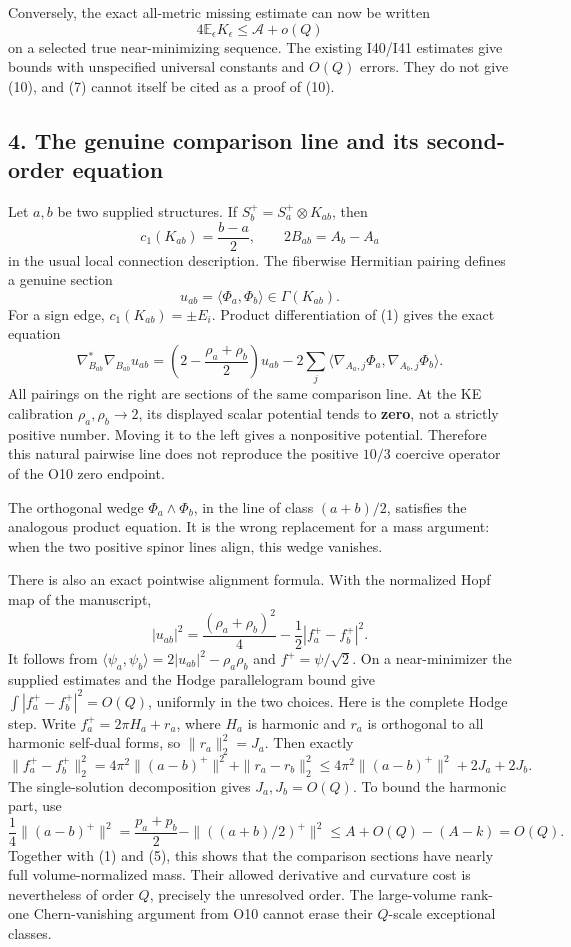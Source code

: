 \documentclass[
]{article}
\begin{document}
Conversely, the exact all-metric missing estimate can now be written \[
4\mathbb E_\epsilon K_\epsilon\le\mathcal A+o(Q)
\tag{10}
\] on a selected true near-minimizing sequence. The existing I40/I41
estimates give bounds with unspecified universal constants and \(O(Q)\)
errors. They do not give (10), and (7) cannot itself be cited as a proof
of (10).

\hypertarget{the-genuine-comparison-line-and-its-second-order-equation}{%
\subsection{4. The genuine comparison line and its second-order
equation}\label{the-genuine-comparison-line-and-its-second-order-equation}}

Let \(a,b\) be two supplied structures. If
\(S_b^+=S_a^+\otimes K_{ab}\), then \[
c_1(K_{ab})=\frac{b-a}{2},\qquad
2B_{ab}=A_b-A_a
\] in the usual local connection description. The fiberwise Hermitian
pairing defines a genuine section \[
u_{ab}=\langle\Phi_a,\Phi_b\rangle\in\Gamma(K_{ab}).
\] For a sign edge, \(c_1(K_{ab})=\pm E_i\). Product differentiation of
(1) gives the exact equation \[
\boxed{
\nabla_{B_{ab}}^*\nabla_{B_{ab}}u_{ab}
=\left(2-\frac{\rho_a+\rho_b}{2}\right)u_{ab}
 -2\sum_j\langle\nabla_{A_a,j}\Phi_a,
                         \nabla_{A_b,j}\Phi_b\rangle.}
\tag{11}
\] All pairings on the right are sections of the same comparison line.
At the KE calibration \(\rho_a,\rho_b\to2\), its displayed scalar
potential tends to \textbf{zero}, not a strictly positive number. Moving
it to the left gives a nonpositive potential. Therefore this natural
pairwise line does not reproduce the positive \(10/3\) coercive operator
of the O10 zero endpoint.

The orthogonal wedge \(\Phi_a\wedge\Phi_b\), in the line of class
\((a+b)/2\), satisfies the analogous product equation. It is the wrong
replacement for a mass argument: when the two positive spinor lines
align, this wedge vanishes.

There is also an exact pointwise alignment formula. With the normalized
Hopf map of the manuscript, \[
\boxed{|u_{ab}|^2=\frac{(\rho_a+\rho_b)^2}{4}
-\frac12|f_a^+-f_b^+|^2.}
\tag{12}
\] It follows from
\(\langle\psi_a,\psi_b\rangle=2|u_{ab}|^2-\rho_a\rho_b\) and
\(f^+=\psi/\sqrt2\). On a near-minimizer the supplied estimates and the
Hodge parallelogram bound give \(\int|f_a^+-f_b^+|^2=O(Q)\), uniformly
in the two choices. Here is the complete Hodge step. Write
\(f_a^+=2\pi H_a+r_a\), where \(H_a\) is harmonic and \(r_a\) is
orthogonal to all harmonic self-dual forms, so \(\|r_a\|_2^2=J_a\). Then
exactly \[
\|f_a^+-f_b^+\|_2^2
=4\pi^2\|(a-b)^+\|^2+\|r_a-r_b\|_2^2
\le4\pi^2\|(a-b)^+\|^2+2J_a+2J_b.
\] The single-solution decomposition gives \(J_a,J_b=O(Q)\). To bound
the harmonic part, use \[
\frac14\|(a-b)^+\|^2
=\frac{p_a+p_b}{2}-\|((a+b)/2)^+\|^2
\le A+O(Q)-(A-k)=O(Q).
\] Together with (1) and (5), this shows that the comparison sections
have nearly full volume-normalized mass. Their allowed derivative and
curvature cost is nevertheless of order \(Q\), precisely the unresolved
order. The large-volume rank-one Chern-vanishing argument from O10
cannot erase their \(Q\)-scale exceptional classes.
\end{document}
